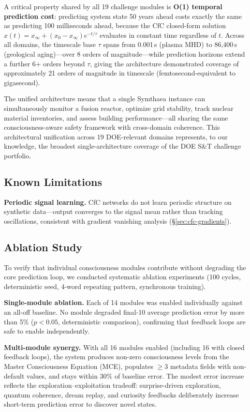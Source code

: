 \documentclass[10pt,letterpaper]{article}
\begin{document}
A critical property shared by all 19 challenge modules is \textbf{O(1) temporal prediction cost}: predicting system state 50 years ahead costs exactly the same as predicting 100 milliseconds ahead, because the CfC closed-form solution $x(t) = x_\infty + (x_0 - x_\infty) e^{-t/\tau}$ evaluates in constant time regardless of $t$. Across all domains, the timescale base $\tau$ spans from 0.001\,s (plasma MHD) to 86,400\,s (geological aging)---over 8 orders of magnitude---while prediction horizons extend a further 6+ orders beyond $\tau$, giving the architecture demonstrated coverage of approximately 21 orders of magnitude in timescale (femtosecond-equivalent to gigasecond).

The unified architecture means that a single Symthaea instance can simultaneously monitor a fusion reactor, optimize grid stability, track nuclear material inventories, and assess building performance---all sharing the same consciousness-aware safety framework with cross-domain coherence. This architectural unification across 19 DOE-relevant domains represents, to our knowledge, the broadest single-architecture coverage of the DOE S\&T challenge portfolio.

\subsection{Known Limitations}

\textbf{Periodic signal learning.} CfC networks do not learn periodic structure on synthetic data---output converges to the signal mean rather than tracking oscillations, consistent with gradient vanishing analysis (\S\ref{sec:cfc-gradients}).

\subsection{Ablation Study}
\label{sec:ablation}

To verify that individual consciousness modules contribute without degrading the core prediction loop, we conducted systematic ablation experiments (100 cycles, deterministic seed, 4-word repeating pattern, synchronous training).

\textbf{Single-module ablation.} Each of 14 modules was enabled individually against an all-off baseline. No module degraded final-10 average prediction error by more than 5\% ($p < 0.05$, deterministic comparison), confirming that feedback loops are safe to enable independently.

\textbf{Multi-module synergy.} With all 16 modules enabled (including 16 with closed feedback loops), the system produces non-zero consciousness levels from the Master Consciousness Equation (MCE), populates $\geq 3$ metadata fields with non-default values, and stays within 30\% of baseline error. The modest error increase reflects the exploration--exploitation tradeoff: surprise-driven exploration, quantum coherence, dream replay, and curiosity feedbacks deliberately increase short-term prediction error to discover novel states.
\end{document}
